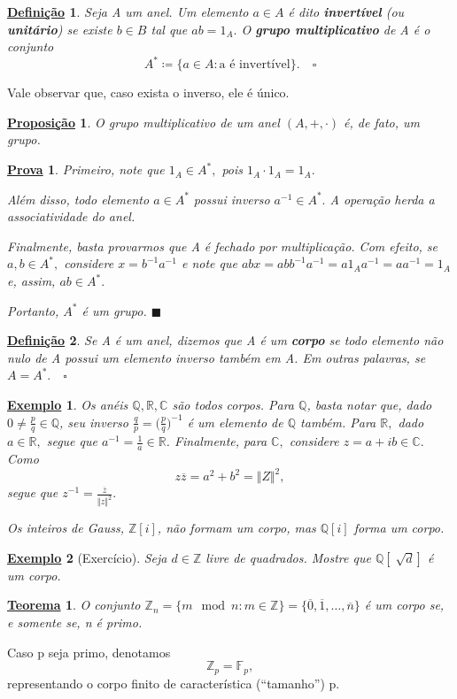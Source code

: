 \documentclass{article}
\newtheorem*{def*}{\underline{Defini\c c\~ao}}
\newtheorem*{theorem*}{\underline{Teorema}}
\newtheorem*{prop*}{\underline{Proposi\c c\~ao}}
\newtheorem{example}{\underline{Exemplo}}
\newtheorem*{proof*}{\underline{Prova}}
\renewcommand\qedsymbol{$\blacksquare$}
\begin{document}
\begin{def*}
  Seja A um anel. Um elemento \(a\in A\) é dito \textbf{invertível} (ou \textbf{unitário}) se existe \(b\in B\) tal que \(ab = 1_{A}.\) O \textbf{grupo multiplicativo} de A
  é o conjunto 
  \[
    A^{*}\coloneqq \{a\in A: \text{a é invertível}\}.\quad\square
  \]
\end{def*}
Vale observar que, caso exista o inverso, ele é único.
\begin{prop*}
  O grupo multiplicativo de um anel \((A, +, \cdot )\) é, de fato, um grupo.
\end{prop*}
\begin{proof*}
  Primeiro, note que \(1_{A}\in A^{*},\) pois \(1_{A} \cdot 1_{A} = 1_{A}.\) 

  Além disso, todo elemento \(a\in A^{*}\) possui inverso \(a^{-1}\in A^{*}.\) A operação herda a associatividade do anel. 

  Finalmente, basta provarmos que A é fechado por multiplicação. Com efeito, se \(a, b\in A^{*},\) considere \(x = b^{-1}a^{-1}\) e note que \(abx = abb^{-1}a^{-1} =
  a 1_{A} a^{-1} = aa^{-1} = 1_{A}\) e, assim, \(ab\in A^{*}.\)

  Portanto, \(A^{*}\) é um grupo. \qedsymbol
\end{proof*}
\begin{def*}
  Se A é um anel, dizemos que A é um \textbf{corpo} se todo elemento não nulo de A possui um elemento inverso também em A. Em outras palavras, se \(A = A^{*}.\quad\square\)
\end{def*}
\begin{example}
  Os anéis \(\mathbb{Q}, \mathbb{R}, \mathbb{C}\) são todos corpos. Para \(\mathbb{Q}\), basta notar que, dado \(0\neq \frac{p}{q}\in \mathbb{Q}\), seu inverso
  \(\frac{q}{p} = \biggl(\frac{p}{q}\biggr)^{-1}\) é um elemento de \(\mathbb{Q}\) também. Para \(\mathbb{R},\) dado \(a\in \mathbb{R},\) segue que \(a^{-1} = \frac{1}{a}\in \mathbb{R}\).
  Finalmente, para \(\mathbb{C},\) considere \(z = a + ib\in \mathbb{C}.\) Como 
  \[
    z\overline{z} = a^{2} + b^{2} = \Vert Z \Vert^{2},
  \]
  segue que \(z^{-1}=\frac{\overline{z}}{\Vert z \Vert^{2}}.\)

  Os inteiros de Gauss, \(\mathbb{Z}[i]\), não formam um corpo, mas \(\mathbb{Q}[i]\) forma um corpo. 
\end{example}
\begin{example}[Exercício]
  Seja \(d\in \mathbb{Z}\) livre de quadrados. Mostre que \(\mathbb{Q}[\sqrt[]{d}]\) é um corpo.
\end{example}
\begin{theorem*}
  O conjunto \(\mathbb{Z}_{n} = \{m\mod n: m\in \mathbb{Z}\} = \{\overline{0}, \overline{1}, \dotsc , \overline{n}\}\) é um corpo se, e somente se, n é primo.
\end{theorem*}
Caso p seja primo, denotamos 
\[
  \mathbb{Z}_{p} = \mathbb{F}_{p},
\]
representando o corpo finito de característica (``tamanho'') p.
\end{document}
